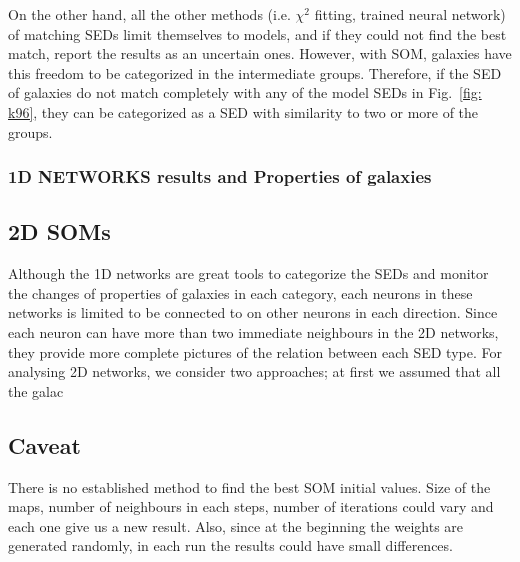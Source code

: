             On the other hand, all the other methods (i.e. $\chi^2$ fitting, trained neural network) of matching SEDs limit themselves to models, and if they could not find the best match, report the results as an uncertain ones.
            However, with SOM, galaxies have this freedom to be categorized in the intermediate groups.
            Therefore, if the SED of galaxies do not match completely with any of the model SEDs in Fig.~\ref{fig: k96}, they can be categorized as a SED with similarity to two or more of the groups.

                        
        \subsubsection{1D NETWORKS results and Properties of galaxies} 
    
    \subsection{2D SOMs}
    \label{sec: 2D}
    Although the 1D networks are great tools to categorize the SEDs and monitor the changes of properties of galaxies in each category, each neurons in these networks is limited to be connected to on other neurons in each direction.
    Since each neuron can have more than two immediate neighbours in the 2D networks, they provide more complete pictures of the relation between each SED type.
    For analysing 2D networks, we consider two approaches; at first we assumed that all the galac
    
    
    

    
    
    \subsection{Caveat}
    There is no established method to find the best SOM initial values. Size of the maps, number of neighbours in each steps, number of iterations could vary and each one give us a new result.
    Also, since at the beginning the weights are generated randomly, in each run the results could have small differences.
    
    